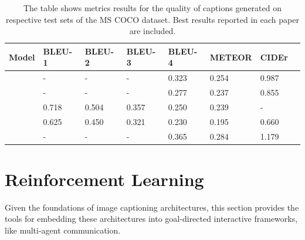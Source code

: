 \begin{table}[]
	\begin{tabularx}{\textwidth}{|X|l|l|l|l|l|l|l|}
		\hline
		Model                               & BLEU-1 & BLEU-2 & BLEU-3 & BLEU-4 & METEOR & CIDEr \\ \hline
		\cite{bengio2015scheduled}        & -      & -      & -      & 0.323   & 0.254  & 0.987 \\ \hline
		\cite{vinyals2015show}  & -      & -      & -      & 0.277    & 0.237  & 0.855 \\ \hline
		\cite{xu2015show} & 0.718  & 0.504  & 0.357  & 0.250     & 0.239  & -     \\ \hline
		\cite{karpathy2015deep}          & 0.625  & 0.450  & 0.321  & 0.230   & 0.195  & 0.660 \\ \hline
		\cite{zhou2019unified}          & -  & -  & -  & 0.365   & 0.284  & 1.179 \pt{?} \\ \hline
	\end{tabularx}
\caption{\label{tab_coco_metrics_ref}The table shows metrics results for the quality of captions generated on respective test sets of the MS COCO dataset. Best results reported in each paper are included.}
\end{table}

\section{Reinforcement Learning}
\label{rl}

Given the foundations of image captioning architectures, this section provides the tools for embedding these architectures into goal-directed interactive frameworks, like multi-agent communication.

